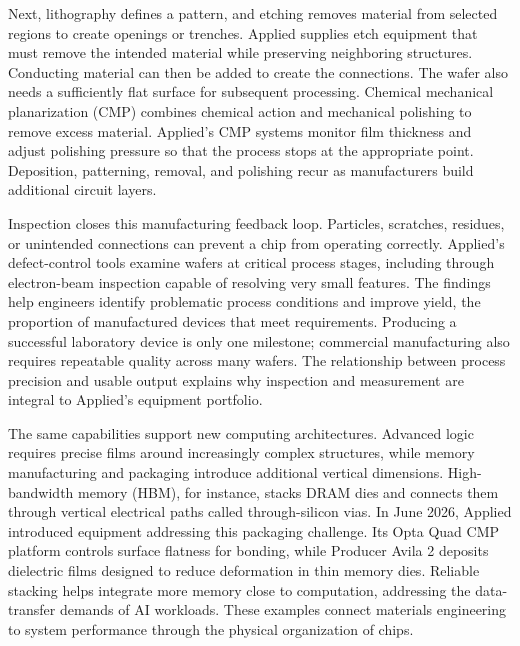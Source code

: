 \documentclass[10pt]{article}
\begin{document}
Next, lithography defines a pattern, and etching removes material from selected regions to create openings or trenches. Applied supplies etch equipment that must remove the intended material while preserving neighboring structures. Conducting material can then be added to create the connections. The wafer also needs a sufficiently flat surface for subsequent processing. Chemical mechanical planarization (CMP) combines chemical action and mechanical polishing to remove excess material. Applied's CMP systems monitor film thickness and adjust polishing pressure so that the process stops at the appropriate point. Deposition, patterning, removal, and polishing recur as manufacturers build additional circuit layers.~\cite{amat-processes}

\begin{samepage}
Inspection closes this manufacturing feedback loop. Particles, scratches, residues, or unintended connections can prevent a chip from operating correctly. Applied's defect-control tools examine wafers at critical process stages, including through electron-beam inspection capable of resolving very small features. The findings help engineers identify problematic process conditions and improve yield, the proportion of manufactured devices that meet requirements. Producing a successful laboratory device is only one milestone; commercial manufacturing also requires repeatable quality across many wafers. The relationship between process precision and usable output explains why inspection and measurement are integral to Applied's equipment portfolio.~\cite{amat-defects}
\par
\end{samepage}

The same capabilities support new computing architectures. Advanced logic requires precise films around increasingly complex structures, while memory manufacturing and packaging introduce additional vertical dimensions. High-bandwidth memory (HBM), for instance, stacks DRAM dies and connects them through vertical electrical paths called through-silicon vias. In June 2026, Applied introduced equipment addressing this packaging challenge. Its Opta Quad CMP platform controls surface flatness for bonding, while Producer Avila 2 deposits dielectric films designed to reduce deformation in thin memory dies. Reliable stacking helps integrate more memory close to computation, addressing the data-transfer demands of AI workloads. These examples connect materials engineering to system performance through the physical organization of chips.~\cite{amat-packaging}
\end{document}
